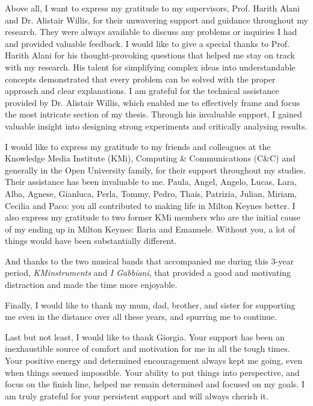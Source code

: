 Above all, I want to express my gratitude to my supervisors, Prof. Harith Alani and Dr. Alistair Willis, for their unwavering support and guidance throughout my research. They were always available to discuss any problems or inquiries I had and provided valuable feedback.
I would like to give a special thanks to Prof. Harith Alani for his thought-provoking questions that helped me stay on track with my research. His talent for simplifying complex ideas into understandable concepts demonstrated that every problem can be solved with the proper approach and clear explanations.
I am grateful for the technical assistance provided by Dr. Alistair Willis, which enabled me to effectively frame and focus the most intricate section of my thesis. Through his invaluable support, I gained valuable insight into designing strong experiments and critically analysing results.


I would like to express my gratitude to my friends and colleagues at the Knowledge Media Institute (KMi), Computing \& Communications (C\&C) and generally in the Open University family, for their support throughout my studies. Their assistance has been invaluable to me. Paula, Angel, Angelo, Lucas, Lara, Alba, Agnese, Gianluca, Perla, Tommy, Pedro, Thais, Patrizia, Julian, Miriam, Cecilia and Paco: you all contributed to making life in Milton Keynes better.
I also express my gratitude to two former KMi members who are the initial cause of my ending up in Milton Keynes: Ilaria and Emanuele. Without you, a lot of things would have been substantially different.

And thanks to the two musical bands that accompanied me during this 3-year period, \emph{KMinstruments} and \emph{I Gabbiani}, that provided a good and motivating distraction and made the time more enjoyable. 

Finally, I would like to thank my mum, dad, brother, and sister for supporting me even in the distance over all these years, and spurring me to continue.%

Last but not least, I would like to thank Giorgia.
Your support has been an inexhaustible source of comfort and motivation for me in all the tough times. Your positive energy and determined encouragement always kept me going, even when things seemed impossible. Your ability to put things into perspective, and focus on the finish line, helped me remain determined and focused on my goals. I am truly grateful for your persistent support and will always cherish it.

